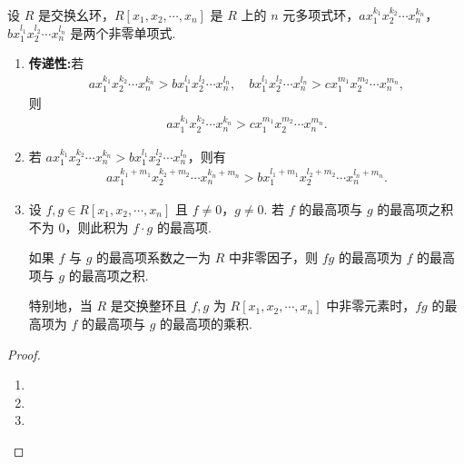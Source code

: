 \documentclass[../../main.tex]{subfiles}%
\begin{document}
\begin{theorem}[单项式的字典排序法的基本性质]\label{theorem:单项式的字典排序法的基本性质}
设 \( R \) 是交换幺环，\( R[x_1, x_2, \cdots, x_n] \) 是 \( R \) 上的 \( n \) 元多项式环，\( ax_1^{k_1}x_2^{k_2}\cdots x_n^{k_n} \)，\( bx_1^{l_1}x_2^{l_2}\cdots x_n^{l_n} \) 是两个非零单项式. 
\begin{enumerate}[(1)]
\item \textbf{传递性:}若
\begin{align*}
ax_1^{k_1}x_2^{k_2}\cdots x_n^{k_n} > bx_1^{l_1}x_2^{l_2}\cdots x_n^{l_n}, \quad bx_1^{l_1}x_2^{l_2}\cdots x_n^{l_n} > cx_1^{m_1}x_2^{m_2}\cdots x_n^{m_n},
\end{align*}
则
\begin{align*}
ax_1^{k_1}x_2^{k_2}\cdots x_n^{k_n} > cx_1^{m_1}x_2^{m_2}\cdots x_n^{m_n}.
\end{align*}

\item 若 \( ax_1^{k_1}x_2^{k_2}\cdots x_n^{k_n} > bx_1^{l_1}x_2^{l_2}\cdots x_n^{l_n} \)，则有
\begin{align*}
ax_1^{k_1+m_1}x_2^{k_2+m_2}\cdots x_n^{k_n+m_n} > bx_1^{l_1+m_1}x_2^{l_2+m_2}\cdots x_n^{l_n+m_n}.
\end{align*}

\item\label{theorem:单项式的字典排序法的基本性质-3} 设 \( f, g \in R[x_1, x_2, \cdots, x_n] \) 且 \( f \neq 0 \)，\( g \neq 0 \). 若 \( f \) 的最高项与 \( g \) 的最高项之积不为 \( 0 \)，则此积为 \( f \cdot g \) 的最高项.

如果 \( f \) 与 \( g \) 的最高项系数之一为 \( R \) 中非零因子，则 \( fg \) 的最高项为 \( f \) 的最高项与 \( g \) 的最高项之积.

特别地，当 \( R \) 是交换整环且 \( f, g \) 为 \( R[x_1, x_2, \cdots, x_n] \) 中非零元素时，\( fg \) 的最高项为 \( f \) 的最高项与 \( g \) 的最高项的乘积.
\end{enumerate}
\end{theorem}
\begin{proof}
\begin{enumerate}[(1)]
\item 

\item 

\item 
\end{enumerate}

\end{proof}
\end{document}
